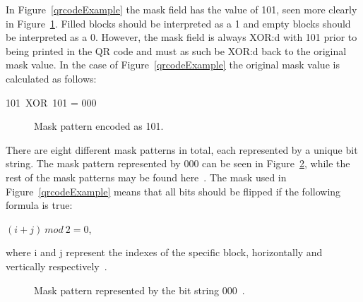 In Figure~\ref{qrcodeExample} the mask field has the value of 101, seen more clearly in Figure~\ref{qrcodeExampleStep3}. Filled blocks should be interpreted as a 1 and empty blocks should be interpreted as a 0. However, the mask field is always XOR:d with 101 prior to being printed in the QR code and must as such be XOR:d back to the original mask value. In the case of Figure~\ref{qrcodeExample} the original mask value is calculated as follows:

\begin{center}
	101~XOR~101 = 000
\end{center}

	\begin{figure}[H]%
		\centering
		\caption{Mask pattern encoded as 101.}
		\label{qrcodeExampleStep3}
	\end{figure}

There are eight different mask patterns in total, each represented by a unique bit string. The mask pattern represented by 000 can be seen in Figure~\ref{qrcodemaskpattern}, while the rest of the mask patterns may be found here~\cite{qrcodeMaskPatterns}. The mask used in Figure~\ref{qrcodeExample} means that all bits should be flipped if the following formula is true:

\begin{center}
	\((i+j)~mod~2=0\), 

	where i and j represent the indexes of the specific block, horizontally and vertically respectively~\cite{qrcodeMaskPatterns}.
\end{center}

	\begin{figure}[H]%
		\centering
		\caption{Mask pattern represented by the bit string 000~\cite{qrcodeMaskPatterns}.}
		\label{qrcodemaskpattern}
	\end{figure}
	
